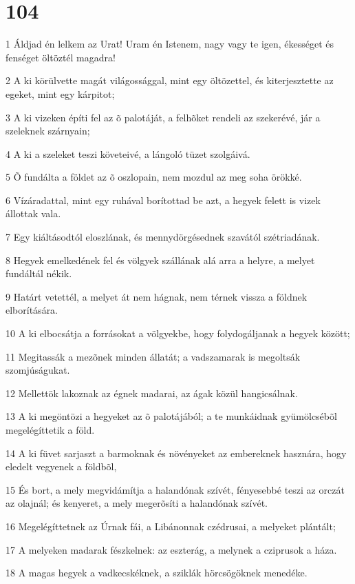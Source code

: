 \chapter{104}

\par 1 Áldjad én lelkem az Urat! Uram én Istenem, nagy vagy te igen, ékességet és fenséget öltöztél magadra!
\par 2 A ki körülvette magát világossággal, mint egy öltözettel, és kiterjesztette az egeket, mint egy kárpitot;
\par 3 A ki vizeken építi fel az õ palotáját, a felhõket rendeli az szekerévé, jár a szeleknek szárnyain;
\par 4 A ki a szeleket teszi követeivé, a lángoló tüzet szolgáivá.
\par 5 Õ fundálta a földet az õ oszlopain, nem mozdul az meg soha örökké.
\par 6 Vízáradattal, mint egy ruhával borítottad be azt, a hegyek felett is vizek állottak vala.
\par 7 Egy kiáltásodtól eloszlának, és mennydörgésednek szavától szétriadának.
\par 8 Hegyek emelkedének fel és völgyek szállának alá arra a helyre, a melyet fundáltál nékik.
\par 9 Határt vetettél, a melyet át nem hágnak, nem térnek vissza a földnek elborítására.
\par 10 A ki elbocsátja a forrásokat a völgyekbe, hogy folydogáljanak a hegyek között;
\par 11 Megitassák a mezõnek minden állatát; a vadszamarak is megoltsák szomjúságukat.
\par 12 Mellettök lakoznak az égnek madarai, az ágak közül hangicsálnak.
\par 13 A ki megöntözi a hegyeket az õ palotájából; a te munkáidnak gyümölcsébõl megelégíttetik a föld.
\par 14 A ki füvet sarjaszt a barmoknak és növényeket az embereknek hasznára, hogy eledelt vegyenek a földbõl,
\par 15 És bort, a mely megvidámítja a halandónak szívét, fényesebbé teszi az orczát az olajnál; és kenyeret, a mely megerõsíti a halandónak szívét.
\par 16 Megelégíttetnek az Úrnak fái, a Libánonnak czédrusai, a melyeket plántált;
\par 17 A melyeken madarak fészkelnek: az eszterág, a melynek a cziprusok a háza.
\par 18 A magas hegyek a vadkecskéknek, a sziklák hörcsögöknek menedéke.
